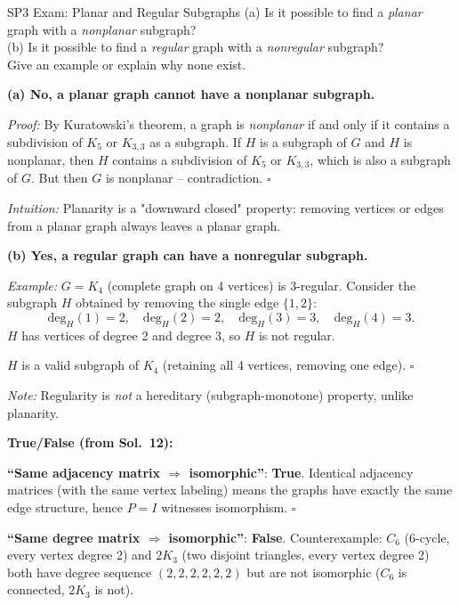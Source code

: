 \begin{exercise}{SP3 Exam: Planar and Regular Subgraphs}
(a) Is it possible to find a \emph{planar} graph with a \emph{nonplanar} subgraph?\\
(b) Is it possible to find a \emph{regular} graph with a \emph{nonregular} subgraph?\\
Give an example or explain why none exist.
\end{exercise}
\begin{solution}
\textbf{(a) No, a planar graph cannot have a nonplanar subgraph.}

\textit{Proof:} By Kuratowski's theorem, a graph is \emph{nonplanar} if and only if it contains a subdivision of $K_5$ or $K_{3,3}$ as a subgraph. If $H$ is a subgraph of $G$ and $H$ is nonplanar, then $H$ contains a subdivision of $K_5$ or $K_{3,3}$, which is also a subgraph of $G$. But then $G$ is nonplanar -- contradiction. $\square$

\textit{Intuition:} Planarity is a "downward closed" property: removing vertices or edges from a planar graph always leaves a planar graph.

\textbf{(b) Yes, a regular graph can have a nonregular subgraph.}

\textit{Example:} $G=K_4$ (complete graph on 4 vertices) is 3-regular. Consider the subgraph $H$ obtained by removing the single edge $\{1,2\}$:
\[
\text{deg}_H(1)=2,\quad\text{deg}_H(2)=2,\quad\text{deg}_H(3)=3,\quad\text{deg}_H(4)=3.
\]
$H$ has vertices of degree 2 and degree 3, so $H$ is not regular.

$H$ is a valid subgraph of $K_4$ (retaining all 4 vertices, removing one edge). $\square$

\textit{Note:} Regularity is \textit{not} a hereditary (subgraph-monotone) property, unlike planarity.
\end{solution}

\medskip
\noindent\textbf{True/False (from Sol.\ 12):}

\textbf{``Same adjacency matrix $\Rightarrow$ isomorphic''}: \textbf{True}. Identical adjacency matrices (with the same vertex labeling) means the graphs have exactly the same edge structure, hence $P=I$ witnesses isomorphism. $\square$

\textbf{``Same degree matrix $\Rightarrow$ isomorphic''}: \textbf{False}. Counterexample: $C_6$ (6-cycle, every vertex degree 2) and $2K_3$ (two disjoint triangles, every vertex degree 2) both have degree sequence $(2,2,2,2,2,2)$ but are not isomorphic ($C_6$ is connected, $2K_3$ is not).
